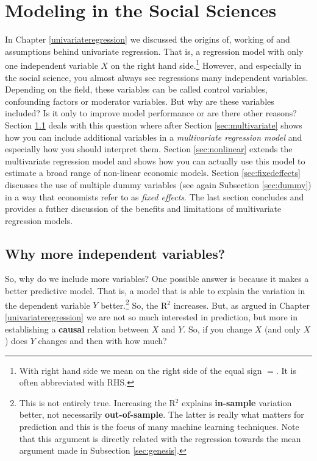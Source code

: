 \documentclass[
]{book}
\begin{document}
\hypertarget{modeling}{%
\chapter{Modeling in the Social Sciences}\label{modeling}}

In Chapter \ref{univariateregression} we discussed the origins of, working of and assumptions behind univariate regression. That is, a regression model with only one independent variable \(X\) on the right hand side.\footnote{With right hand side we mean on the right side of the equal sign \(=\). It is often abbreviated with RHS.} However, and especially in the social science, you almost always see regressions many independent variables. Depending on the field, these variables can be called control variables, confounding factors or moderator variables. But why are these variables included? Is it only to improve model performance or are there other reasons? Section \ref{sec:morevar} deals with this question where after Section \ref{sec:multivariate} shows how you can include additional variables in a \emph{multivariate regression model} and especially how you should interpret them. Section \ref{sec:nonlinear} extends the multivariate regression model and shows how you can actually use this model to estimate a broad range of non-linear economic models. Section \ref{sec:fixedeffects} discusses the use of multiple dummy variables (see again Subsection \ref{sec:dummy}) in a way that economists refer to as \emph{fixed effects}. The last section concludes and provides a futher discussion of the benefits and limitations of multivariate regression models.

\hypertarget{sec:morevar}{%
\section{Why more independent variables?}\label{sec:morevar}}

So, why do we include more variables? One possible answer is because it makes a better predictive model. That is, a model that is able to explain the variation in the dependent variable \(Y\) better.\footnote{This is not entirely true. Increasing the R\(^2\) explains \textbf{in-sample} variation better, not necessarily \textbf{out-of-sample}. The latter is really what matters for prediction and this is the focus of many machine learning techniques. Note that this argument is directly related with the regression towards the mean argument made in Subsection \ref{sec:genesis}.} So, the R\(^2\) increases. But, as argued in Chapter \ref{univariateregression} we are not so much interested in prediction, but more in establishing a \textbf{causal} relation between \(X\) and \(Y\). So, if you change \(X\) (and only \(X\)) does \(Y\) changes and then with how much?
\end{document}
